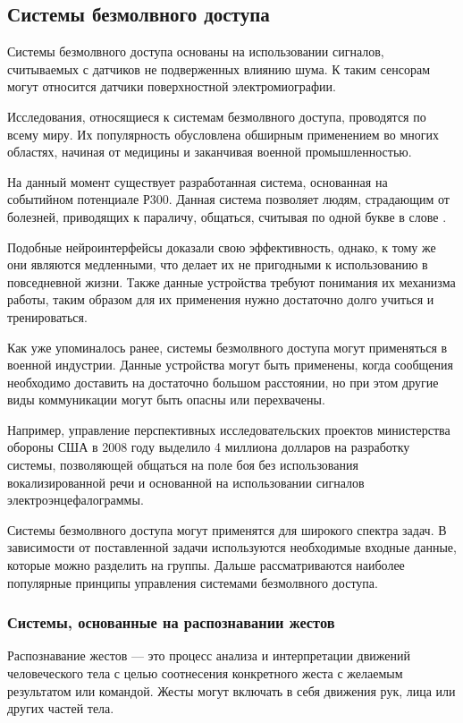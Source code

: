 \subsection{Системы безмолвного доступа}

Системы безмолвного доступа основаны на использовании сигналов, считываемых с датчиков не подверженных влиянию шума. К таким сенсорам могут относится датчики поверхностной электромиографии.

Исследования, относящиеся к системам безмолвного доступа, проводятся по всему миру. Их популярность обусловлена обширным применением во многих областях, начиная от медицины и заканчивая военной промышленностью.

На данный момент существует разработанная система, основанная на событийном потенциале Р300. Данная система позволяет людям, страдающим от болезней, приводящих к параличу, общаться, считывая по одной букве в слове \cite{bib:EMG:1}.

Подобные нейроинтерфейсы доказали свою эффективность, однако, к тому же они являются медленными, что делает их не пригодными к использованию в повседневной жизни. Также данные устройства требуют понимания их механизма работы, таким образом для их применения нужно достаточно долго учиться и тренироваться.

Как уже упоминалось ранее, системы безмолвного доступа могут применяться в военной индустрии. Данные устройства могут быть применены, когда сообщения необходимо доставить на достаточно большом расстоянии, но при этом другие виды коммуникации могут быть опасны или перехвачены.

Например, управление перспективных исследовательских проектов министерства обороны США в 2008 году выделило 4 миллиона долларов на разработку системы, позволяющей общаться на поле боя без использования вокализированной речи и основанной на использовании сигналов электроэнцефалограммы.

Системы безмолвного доступа могут применятся для широкого спектра задач. В зависимости от поставленной задачи используются необходимые входные данные, которые можно разделить на группы. Дальше рассматриваются наиболее популярные принципы управления системами безмолвного доступа.

\subsubsection{Системы, основанные на распознавании жестов}

Распознавание жестов — это процесс анализа и интерпретации движений человеческого тела с целью соотнесения конкретного жеста с желаемым результатом или командой. Жесты могут включать в себя движения рук, лица или других частей тела.

